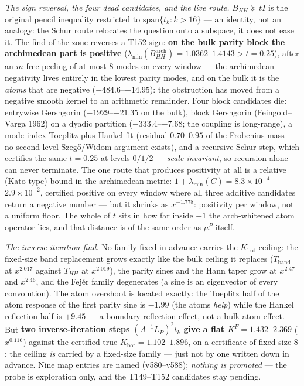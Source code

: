 \documentclass[11pt,a4paper]{article}
\begin{document}
\emph{The sign reversal, the four dead candidates, and the live route.} $B_{HH}\succeq tI$ is
the original pencil inequality restricted to $\mathrm{span}\{t_k:k>16\}$ --- an identity, not
an analogy: the Schur route relocates the question onto a subspace, it does not ease it. The
find of the zone reverses a T152 sign: \textbf{on the bulk parity block the archimedean part
is positive} ($\lambda_{\min}(B^{\mathrm{arch}}_{HH})=1.0362$--$1.4143>t=0.25$), after an
$m$-free peeling of at most $8$ modes on every window --- the archimedean negativity lives
entirely in the lowest parity modes, and on the bulk it is the \emph{atoms} that are negative
($-484.6$--$-14.95$): the obstruction has moved from a negative smooth kernel to an
arithmetic remainder. Four block candidates die: entrywise Gershgorin ($-1929$--$-21.35$ on
the bulk), block Gershgorin (Feingold--Varga 1962) on a dyadic partition
($-333.4$--$-7.68$; the coupling is long-range), a mode-index Toeplitz-plus-Hankel fit
(residual $0.70$--$0.95$ of the Frobenius mass --- no second-level Szeg\H{o}/Widom argument
exists), and a recursive Schur step, which certifies the same $t=0.25$ at levels $0/1/2$ ---
\emph{scale-invariant}, so recursion alone can never terminate. The one route that produces
positivity at all is a relative (Kato-type) bound in the archimedean metric:
$1+\lambda_{\min}(C)=8.3\times10^{-4}$--$2.9\times10^{-2}$, certified positive on every window
where all three additive candidates return a negative number --- but it shrinks as
$x^{-1.778}$: positivity per window, not a uniform floor. The whole of $t$ sits in how far
inside $-1$ the arch-whitened atom operator lies, and that distance is of the same order as
$\mu^P_1$ itself.

\emph{The inverse-iteration find.} No family fixed in advance carries the $K_{\mathrm{bot}}$
ceiling: the fixed-size band replacement grows exactly like the bulk ceiling it replaces
($T_{\mathrm{band}}$ at $x^{2.017}$ against $T_{HH}$ at $x^{2.019}$), the parity sines and
the Hann taper grow at $x^{2.47}$ and $x^{2.46}$, and the Fej\'er family degenerates (a sine
is an eigenvector of every convolution). The atom overshoot is located exactly: the Toeplitz
half of the atom response of the first parity sine is $-1.99$ (the atoms \emph{help}) while
the Hankel reflection half is $+9.45$ --- a boundary-reflection effect, not a bulk-atom
effect. But \textbf{two inverse-iteration steps $(A^{-1}L_P)^2t_k$ give a flat
$K^F=1.432$--$2.369$} ($x^{0.116}$) against the certified true
$K_{\mathrm{bot}}=1.102$--$1.896$, on a certificate of fixed size $8$: the ceiling \emph{is}
carried by a fixed-size family --- just not by one written down in advance. Nine map entries
are named (v580--v588); \emph{nothing is promoted} --- the probe is exploration only, and the
T149--T152 candidates stay pending.
\end{document}
